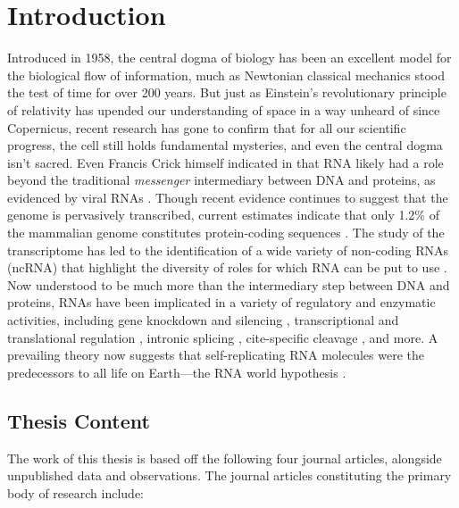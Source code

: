 
\chapter{Introduction}
\label{ch:intro}


Introduced in 1958, the central dogma of biology has been an excellent model for
the biological flow of information, much as Newtonian classical mechanics stood the
test of time for over 200 years. But just as Einstein’s revolutionary principle of
relativity has upended our understanding of space in a way unheard of since
Copernicus, recent research has gone to confirm that for all our scientific
progress, the cell still holds fundamental mysteries, and even the central dogma
isn't sacred. Even Francis Crick himself indicated in \citep{crick:1970wb} that
RNA likely had a role beyond the traditional {\em messenger} intermediary between
DNA and proteins, as evidenced by viral RNAs \citep{coffin:1997ws}. Though recent
evidence continues to suggest that the genome is pervasively transcribed, current
estimates indicate that only 1.2\% of the mammalian genome constitutes
protein-coding sequences \citep{berretta:2009tq,clark:2011cc,jensen:2013vb}. The
study of the transcriptome has led to the identification of a wide variety of
non-coding RNAs (ncRNA) that highlight the diversity of roles for which RNA can
be put to use \citep{costa:2005ug}. Now understood to be much more than the
intermediary step between DNA and proteins, RNAs have been implicated in a variety
of regulatory and enzymatic activities, including gene knockdown and silencing
\citep{fire:1998tv,mccaffrey:2002tf,hannon:2002vn,he:2004uk},
transcriptional and translational regulation \citep{nudler:2004vm,mandal:2004vh},
intronic splicing \citep{kruger:1982wk,cech:1990tn}, cite-specific cleavage
\citep{doherty:2001wq}, and more.
A prevailing theory now suggests that self-replicating RNA molecules were the
predecessors to all life on Earth---the RNA world hypothesis \citep{gilbert:1986td}.

\section{Thesis Content}
\label{sec:intro:thesiscontent}

The work of this thesis is based off the following four journal articles, alongside
unpublished data and observations. The journal articles constituting the
primary body of research include:

